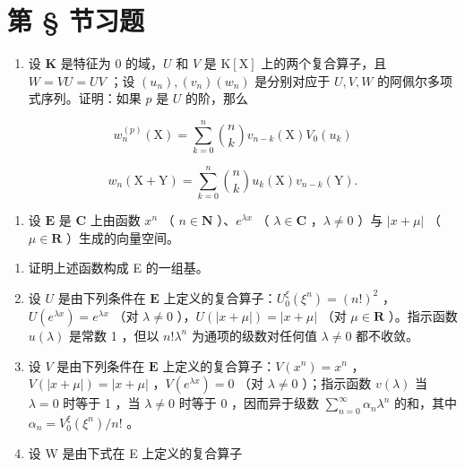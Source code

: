 \section*{第 \S{} 节习题}
{}

\begin{enumerate}
\def\labelenumi{\arabic{enumi})}
\tightlist
\item
  设 \(\mathbf{K}\) 是特征为 0 的域，\(U\) 和 \(V\) 是 \(\mathrm{K}[\mathrm{X}]\) 上的两个复合算子，且 \(W = VU = UV\) ；设 \((u_n), (v_n)(w_n)\) 是分别对应于 \(U, V, W\) 的阿佩尔多项式序列。证明：如果 \(p\) 是 \(U\) 的阶，那么
\end{enumerate}

\[
w _ {n} ^ {(p)} (\mathrm{X}) = \sum_ {k = 0} ^ {n} \binom {n} {k} v _ {n - k} (\mathrm{X}) V _ {0} (u _ {k})
\]

\[
w _ {n} (\mathrm{X} + \mathrm{Y}) = \sum_ {k = 0} ^ {n} \binom {n} {k} u _ {k} (\mathrm{X}) v _ {n - k} (\mathrm{Y}).
\]

\begin{enumerate}
\def\labelenumi{\arabic{enumi})}
\setcounter{enumi}{1}
\tightlist
\item
  设 \(\mathbf{E}\) 是 \(\mathbf{C}\) 上由函数 \(x^n\) （ \(n \in \mathbf{N}\) ）、\(e^{\lambda x}\) （ \(\lambda \in \mathbf{C}\) ，\(\lambda \neq 0\) ）与 \(|x + \mu|\) （ \(\mu \in \mathbf{R}\) ）生成的向量空间。
\end{enumerate}

\begin{enumerate}
\def\labelenumi{\alph{enumi})}
\item
  证明上述函数构成 E 的一组基。
\item
  设 \(U\) 是由下列条件在 \(\mathbf{E}\) 上定义的复合算子：\(U_0^\xi (\xi^n) = (n!)^2\) ，\(U(e^{\lambda x}) = e^{\lambda x}\) （对 \(\lambda \neq 0\) ），\(U(|x + \mu|) = |x + \mu|\) （对 \(\mu \in \mathbf{R}\) ）。指示函数 \(u(\lambda)\) 是常数 1 ，但以 \(n!\lambda^n\) 为通项的级数对任何值 \(\lambda \neq 0\) 都不收敛。
\item
  设 \(V\) 是由下列条件在 \(\mathbf{E}\) 上定义的复合算子：\(V(x^n) = x^n\) ，\(V(|x + \mu|) = |x + \mu|\) ，\(V(e^{\lambda x}) = 0\) （对 \(\lambda \neq 0\) ）；指示函数 \(v(\lambda)\) 当 \(\lambda = 0\) 时等于 1 ，当 \(\lambda \neq 0\) 时等于 0 ，因而异于级数 \(\sum_{n=0}^{\infty} \alpha_n \lambda^n\) 的和，其中 \(\alpha_n = V_0^\xi(\xi^n)/n!\) 。
\item
  设 W 是由下式在 E 上定义的复合算子
\end{enumerate}

